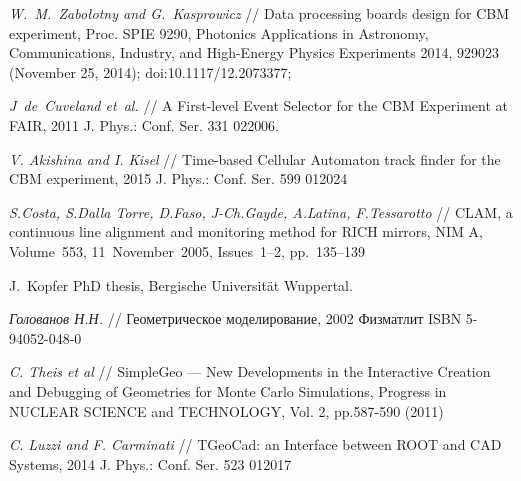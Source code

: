 \begin{thebibliography}{99}
\textit{W.~M.~Zabołotny and G.~Kasprowicz} //
Data processing boards design for CBM experiment,
Proc. SPIE 9290, Photonics Applications in Astronomy, Communications, Industry, and High-Energy Physics Experiments 2014, 929023 (November 25, 2014); doi:10.1117/12.2073377;

\textit{J~de~Cuveland et~al.} //
A First-level Event Selector for the CBM Experiment at FAIR,
2011 J. Phys.: Conf. Ser. 331 022006.

\textit{V. Akishina and I. Kisel} //
Time-based Cellular Automaton track finder for the CBM experiment,
2015 J. Phys.: Conf. Ser. 599 012024

\textit{S.Costa, S.Dalla Torre, D.Faso, J-Ch.Gayde, A.Latina, F.Tessarotto} //
CLAM, a continuous line alignment and monitoring method for RICH mirrors,
NIM A, Volume~553, 11~November~2005, Issues~1--2, pp.~135--139

J.~Kopfer PhD thesis, Bergische Universit\"{a}t Wuppertal.


\textit{Голованов Н.Н.} //
Геометрическое моделирование,
2002 Физматлит ISBN 5-94052-048-0







\textit{C. Theis et al} //
SimpleGeo --- New Developments in the Interactive Creation and Debugging of Geometries for Monte Carlo Simulations,
Progress in NUCLEAR SCIENCE and TECHNOLOGY, Vol. 2, pp.587-590 (2011)

\textit{C. Luzzi and F. Carminati} //
TGeoCad: an Interface between ROOT and CAD Systems,
2014 J. Phys.: Conf. Ser. 523 012017


\end{thebibliography}
